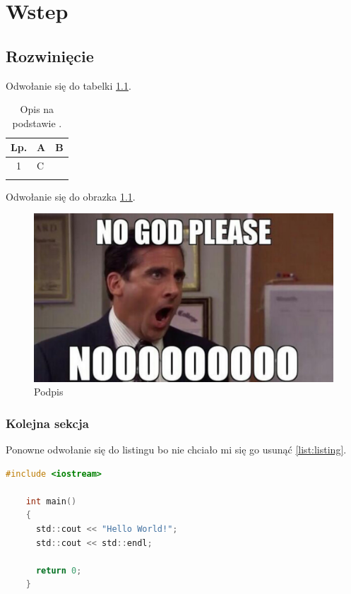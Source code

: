\chapter{Wstep}
\noindent \lipsum[2-4]

\section{Rozwinięcie}
\noindent \lipsum[5-6] Odwołanie się do tabelki \ref{tab:tabelka}.

\begin{longtable}{|c|p{4cm}|p{8cm}|}
	\hline
	\textbf{Lp.} &
	\textbf{A} &
	\textbf{B} \\ \hline\hline
	1 & C & \lipsum[7]\\
	\hline
	\caption{Opis na podstawie \cite{domain_tree_src}.}
	\label{tab:tabelka}
\end{longtable}

\lipsum[10-12] Odwołanie się do obrazka \ref{obrazek}.

\begin{center}
	\begin{figure}
	\centering
	\includegraphics[scale=0.3]{image/obrazek}
	\caption{Podpis}
	\label{obrazek}
	\end{figure}
\end{center}

\subsection{Kolejna sekcja}
\noindent \lipsum[12-13] Ponowne odwołanie się do listingu bo nie chciało mi się go usunąć \ref{list:listing}.

\begin{lstlisting}[label={list:listing},captionpos=b,caption=Przykładowy listing.,language=c]
	#include <iostream>

	int main()
	{
	  std::cout << "Hello World!";
	  std::cout << std::endl;

	  return 0;
	}
\end{lstlisting}
